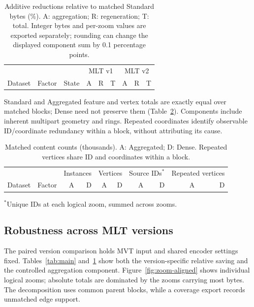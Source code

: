 \begin{table}[!tp]\centering\footnotesize
\caption{Additive reductions relative to matched Standard bytes (\%). A: aggregation;
R: regeneration; T: total. Integer bytes and per-zoom values are exported separately;
rounding can change the displayed component sum by 0.1 percentage points.}
\label{tab:decomposition}
\begin{tabular}{@{}lrlrrrrrr@{}}\toprule
& & & \multicolumn{3}{c}{MLT v1} & \multicolumn{3}{c}{MLT v2}\\
Dataset & Factor & State & A & R & T & A & R & T\\
\midrule\end{tabular}\end{table}

Standard and Aggregated feature and vertex totals are exactly equal over matched
blocks; Dense need not preserve them (Table~\ref{tab:content-differences}). Components
include inherent multipart geometry and rings. Repeated coordinates identify
observable ID/coordinate redundancy within a block, without attributing its cause.

\begin{table}[!tp]\centering\footnotesize
\caption{Matched content counts (thousands). A: Aggregated; D: Dense. Repeated vertices
share ID and coordinates within a block.}\label{tab:content-differences}
\setlength{\tabcolsep}{3pt}
\begin{tabular}{@{}lrrrrrrrrr@{}}\toprule
& & \multicolumn{2}{c}{Instances} & \multicolumn{2}{c}{Vertices} &
\multicolumn{2}{c}{Source IDs$^*$} & \multicolumn{2}{c}{Repeated vertices}\\
Dataset & Factor & A & D & A & D & A & D & A & D\\
\midrule\end{tabular}
\par\smallskip $^*$Unique IDs at each logical zoom, summed across zooms.
\end{table}

\subsection{Robustness across MLT versions}\label{sec:results-versions}
The paired version comparison holds MVT input and shared encoder settings fixed.
Tables~\ref{tab:main} and~\ref{tab:decomposition} show both the version-specific
relative saving and the controlled aggregation component. Figure~\ref{fig:zoom-aligned}
shows individual logical zooms; absolute totals are dominated by the zooms carrying
most bytes. The decomposition uses common parent blocks, while a coverage export
records unmatched edge support.

